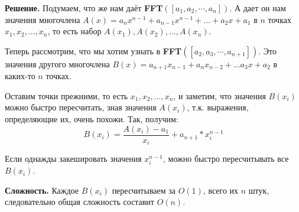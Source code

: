 \begin{enumerate}
	\textbf{Решение.} Подумаем, что же нам даёт \textbf{FFT}$([a_1, a_2, \cdots , a_n])$. А дает он нам значения 
	многочлена $A(x) = a_n x^{n - 1} + a_{n - 1} x^{n - 1} + \dots + a_2 x + a_1$ в $n$ точках $x_1, x_2, \dots, 
	x_n$, то есть набор $A(x_1), A(x_2), \dots, A(x_n)$.
	
	Теперь рассмотрим, что мы хотим узнать в \textbf{FFT}$([a_2, a_3, \cdots , a_{n+1}])$. Это значения другого 
	многочлена $B(x) = a_{n + 1} x_{n - 1} + a_n x_{n - 2} + \dots a_3 x + a_2$ в каких-то $n$ точках. 
	
	Оставим точки прежними, то есть  $x_1, x_2, \dots, x_n$, и заметим, что значения $B(x_i)$ можно быстро 
	пересчитать, зная значения $A(x_i)$, т.к. выражения, определяющие их, очень похожи. Так, получим:
	\begin{equation*}
		B(x_i) = \frac{A(x_i) - a_1}{x_i} + a_{n + 1} * x_i^{n - 1}
	\end{equation*}
	
	Если однажды закешировать значения $x_i^{n - 1}$, можно быстро пересчитывать все $B(x_i)$. 
	
	\textbf{Сложность.} Каждое $B(x_i)$ пересчитываем за $O(1)$, всего их $n$ штук, следовательно общая сложность 
	составит $O(n)$.
	
\end{enumerate}



